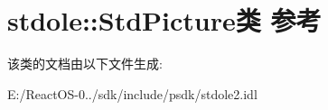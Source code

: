 \hypertarget{classstdole_1_1_std_picture}{}\section{stdole\+:\+:Std\+Picture类 参考}
\label{classstdole_1_1_std_picture}


该类的文档由以下文件生成\+:\begin{DoxyCompactItemize}
\item 
E\+:/\+React\+O\+S-\/0../sdk/include/psdk/stdole2.\+idl\end{DoxyCompactItemize}

